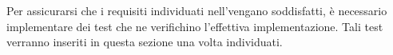 Per assicurarsi che i requisiti individuati nell'\AdR vengano soddisfatti, è necessario implementare dei test che ne verifichino l'effettiva implementazione.
\newline
Tali test verranno inseriti in questa sezione una volta individuati.